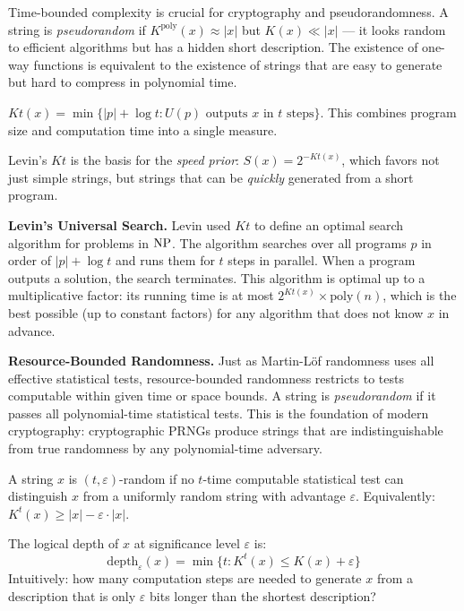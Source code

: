 Time-bounded complexity is crucial for cryptography and pseudorandomness. A string is \emph{pseudorandom} if $K^{\text{poly}}(x) \approx |x|$ but $K(x) \ll |x|$ --- it looks random to efficient algorithms but has a hidden short description. The existence of one-way functions is equivalent to the existence of strings that are easy to generate but hard to compress in polynomial time.

\begin{definition}
$Kt(x) = \min \{ |p| + \log t : U(p) \text{ outputs } x \text{ in } t \text{ steps} \}$.
This combines program size and computation time into a single measure.
\end{definition}

Levin's $Kt$ is the basis for the \emph{speed prior}: $S(x) = 2^{-Kt(x)}$, which favors not just simple strings, but strings that can be \emph{quickly} generated from a short program.

\textbf{Levin's Universal Search.} Levin used $Kt$ to define an optimal search algorithm for problems in $\text{NP}$. The algorithm searches over all programs $p$ in order of $|p| + \log t$ and runs them for $t$ steps in parallel. When a program outputs a solution, the search terminates. This algorithm is optimal up to a multiplicative factor: its running time is at most $2^{Kt(x)} \times \text{poly}(n)$, which is the best possible (up to constant factors) for any algorithm that does not know $x$ in advance.

\textbf{Resource-Bounded Randomness.} Just as Martin-L\"of randomness uses all effective statistical tests, resource-bounded randomness restricts to tests computable within given time or space bounds. A string is \emph{pseudorandom} if it passes all polynomial-time statistical tests. This is the foundation of modern cryptography: cryptographic PRNGs produce strings that are indistinguishable from true randomness by any polynomial-time adversary.

\begin{definition}
A string $x$ is $(t,\varepsilon)$-random if no $t$-time computable statistical test can distinguish $x$ from a uniformly random string with advantage $\varepsilon$. Equivalently: $K^t(x) \ge |x| - \varepsilon \cdot |x|$.
\end{definition}

\begin{definition}
The logical depth of $x$ at significance level $\varepsilon$ is:
\[
\text{depth}_\varepsilon(x) = \min \{ t : K^t(x) \le K(x) + \varepsilon \}
\]
Intuitively: how many computation steps are needed to generate $x$ from a description that is only $\varepsilon$ bits longer than the shortest description?
\end{definition}

